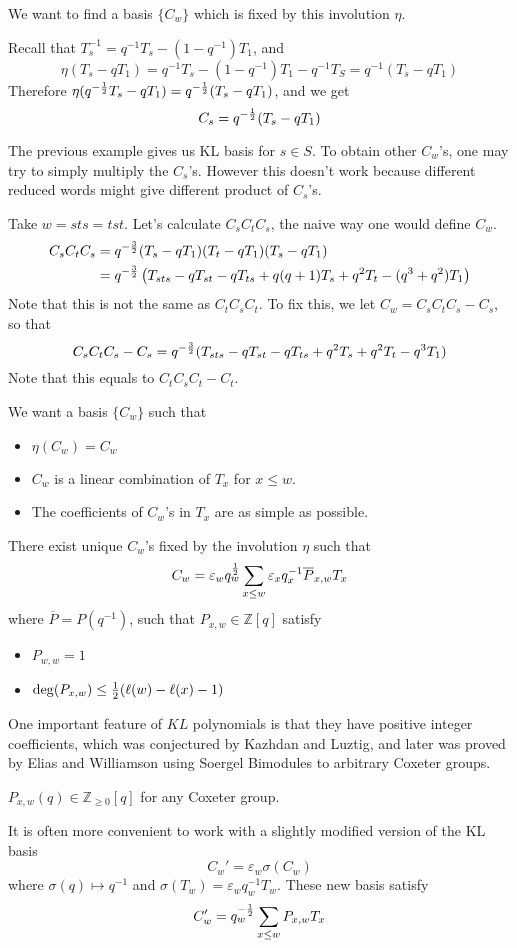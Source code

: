 We want to find a basis $\{C_w\}$ which is fixed by this involution $\eta$.
\begin{example}
	Recall that $T_s^{-1}=q^{-1}T_s-(1-q^{-1})T_1$, and
	\[\eta(T_s-qT_1)=q^{-1}T_s-(1-q^{-1})T_1-q^{-1}T_S=q^{-1}(T_s-qT_1)\]
	Therefore $\eta(q^{-{1\over 2}}T_s-qT_1)=q^{-{1\over 2}}(T_s-qT_1)$, and we get
	\[ C_s=q^{-{1\over 2}}(T_s-qT_1)\]
\end{example}
The previous example gives us KL basis for $s\in S$. To obtain other $C_w$'s, one may try to simply multiply the $C_s$'s. However this doesn't work because different reduced words might give different product of $C_s$'s.
\begin{example}
	Take $w=sts=tst$. Let's calculate $C_sC_tC_s$, the naive way one would define $C_w$.
	\begin{align*}C_sC_tC_s&=q^{-{3\over 2}}(T_s-qT_1)(T_t-qT_1)(T_s-qT_1)\\
	&=q^{-{3\over 2}}\left(T_{sts}-qT_{st}-qT_{ts}+q(q+1)T_s+q^2T_t-(q^3+q^2)T_1\right)
		\end{align*}
		Note that this is not the same as $C_tC_sC_t$. To fix this, we let $C_w=C_sC_tC_s-C_s$, so that
		\[C_sC_tC_s-C_s=q^{-{3\over 2}}(T_{sts}-qT_{st}-qT_{ts}+q^2T_s+q^2T_t-q^3 T_1)\]
		Note that this equals to $C_tC_sC_t-C_t$.
\end{example}
We want a basis $\{C_w\}$ such that
\begin{itemize}
    \item $\eta(C_w)=C_w$
	\item $C_w$ is a linear combination of $T_x$ for $x\leq w$.
	\item The coefficients of $C_w$'s in $T_x$ are as simple as possible.
\end{itemize}

\begin{theorem}
\label{thm:KL_basis}
	There exist unique $C_w$'s fixed by the involution $\eta$ such that
%
	\[C_w=\varepsilon_wq_w^{1\over 2}\sum_{x\leq w}\varepsilon_xq_x^{-1}\overline{P}_{x,w} T_x\]
	where $\overline{P}=P(q^{-1})$, such that $P_{x,w}\in\mathbb{Z}[q]$ satisfy
	\begin{itemize}
		\item $P_{w,w}=1$
		\item $ \deg(P_{x,w})\leq  {1\over 2} (\ell(w)-\ell(x)-1)$ 
	\end{itemize}
	\end{theorem}
	One important feature of $KL$ polynomials is that they have positive integer coefficients, which was conjectured by Kazhdan and Luztig, and later was proved by Elias and Williamson using Soergel Bimodules to arbitrary Coxeter groups.
	\begin{theorem}
		$P_{x,w}(q)\in \mathbb{Z}_{\geq 0}[q]$ for any Coxeter group.
	\end{theorem}
	It is often more convenient to work with a slightly modified version of the KL basis
	\[C_w'=\varepsilon_w \sigma(C_w)\]
	where $\sigma(q)\mapsto q^{-1}$ and $\sigma(T_w)=\varepsilon_w q_w^{-1} T_w$. These new basis satisfy
	\[C'_w=q_w^{-{1\over 2}}\sum_{x\leq w}P_{x,w}T_x\]